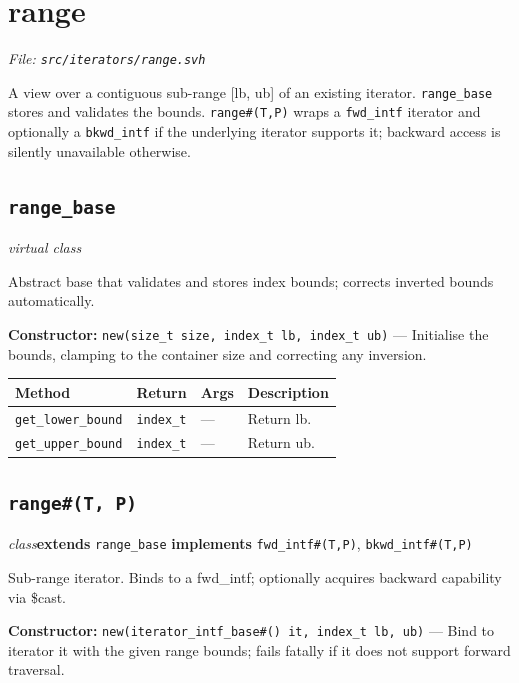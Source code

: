 \documentclass[11pt,letterpaper]{report}
\begin{document}
\section{range}
\noindent\small\textit{File: \texttt{src/iterators/range.svh}}\par

A view over a contiguous sub-range [lb, ub] of an existing iterator. \texttt{range\_base} stores and validates the bounds. \texttt{range\#(T,P)} wraps a \texttt{fwd\_intf} iterator and optionally a \texttt{bkwd\_intf} if the underlying iterator supports it; backward access is silently unavailable otherwise.

\subsection*{\texttt{range\_base}}
\noindent\small\textit{virtual class}\par

Abstract base that validates and stores index bounds; corrects inverted bounds automatically.

\noindent\textbf{Constructor:} \texttt{new(size\_t size, index\_t lb, index\_t ub)} --- Initialise the bounds, clamping to the container size and correcting any inversion.

\begin{xltabular}{\linewidth}{>{\small}p{1.35in} >{\small}p{1.25in} >{\small}p{0.95in} >{\small}X}
\toprule
\textbf{Method} & \textbf{Return} & \textbf{Args} & \textbf{Description} \\
\midrule
\endhead
\bottomrule
\endfoot
\texttt{get\_lower\_bound} & \texttt{index\_t} & --- & Return lb. \\
\texttt{get\_upper\_bound} & \texttt{index\_t} & --- & Return ub. \\
\end{xltabular}

\subsection*{\texttt{range\#(T, P)}}
\noindent\small\textit{class}\quad \textbf{extends} \texttt{range\_base} \quad \textbf{implements} \texttt{fwd\_intf\#(T,P)}, \texttt{bkwd\_intf\#(T,P)}\par

Sub-range iterator. Binds to a fwd\_intf; optionally acquires backward capability via \$cast.

\noindent\textbf{Constructor:} \texttt{new(iterator\_intf\_base\#() it, index\_t lb, ub)} --- Bind to iterator it with the given range bounds; fails fatally if it does not support forward traversal.
\end{document}
